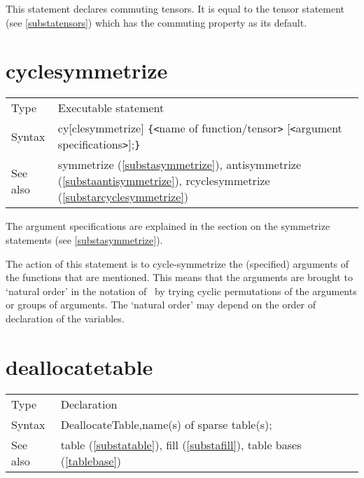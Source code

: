 \noindent This statement declares commuting 
tensors. It is equal to the tensor statement (see 
\ref{substatensors}) which has the commuting property as its default. 
\vspace{10mm}


\section{cyclesymmetrize}
\label{substacyclesymmetrize}

\noindent \begin{tabular}{ll}
Type & Executable statement\\
Syntax & cy[clesymmetrize] \verb:{:{\tt<}name of function/tensor{\tt>}
         [{\tt<}argument specifications{\tt>}];\verb:}: \\
See also & symmetrize (\ref{substasymmetrize}), antisymmetrize 
(\ref{substaantisymmetrize}), rcyclesymmetrize (\ref{substarcyclesymmetrize})
\end{tabular} \vspace{4mm}

\noindent The argument specifications are explained 
in the section on the symmetrize statements (see \ref{substasymmetrize}). 
\medskip

\noindent The action of this statement is to cycle-symmetrize the (specified) 
arguments of the functions that are mentioned. This means that the 
arguments are brought to `natural order' in the notation of \FORM\ by trying 
cyclic permutations of the arguments or groups of arguments. The `natural 
order' may depend on the order of declaration of the variables. 
\vspace{10mm}

 
\section{deallocatetable}
\label{substadeallocatetable}

\noindent \begin{tabular}{ll}
Type & Declaration\\
Syntax & DeallocateTable,name(s) of sparse table(s);
\\ See also & table (\ref{substatable}), fill (\ref{substafill}),
   table bases (\ref{tablebase})
\end{tabular} \vspace{4mm}

